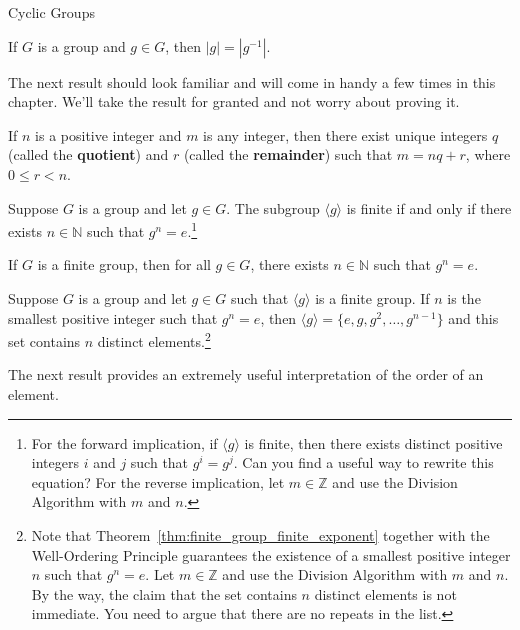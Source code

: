 \begin{section}{Cyclic Groups}
\begin{theorem}
If $G$ is a group and $g\in G$, then $|g|=|g^{-1}|$.
\end{theorem}

The next result should look familiar and will come in handy a few times in this chapter. We'll take the result for granted and not worry about proving it.

\begin{theorem}
If $n$ is a positive integer and $m$ is any integer, then there exist unique integers $q$ (called the \textbf{quotient}) and $r$ (called the \textbf{remainder}) such that $m=nq+r$, where $0\leq r<n$.
\end{theorem}

\begin{theorem}\label{thm:finite_group_finite_exponent}
Suppose $G$ is a group and let $g\in G$. The subgroup $\langle g\rangle$ is finite if and only if there exists $n\in\mathbb{N}$ such that $g^n=e$.\footnote{For the forward implication, if $\langle g\rangle$ is finite, then there exists distinct positive integers $i$ and $j$ such that $g^i=g^j$.  Can you find a useful way to rewrite this equation? For the reverse implication, let $m\in\mathbb{Z}$ and use the Division Algorithm with $m$ and $n$.}
\end{theorem}

\begin{corollary}\label{cor:finite_group_finite_exponent}
If $G$ is a finite group, then for all $g\in G$, there exists $n\in\mathbb{N}$ such that $g^n=e$.
\end{corollary}

\begin{theorem}
Suppose $G$ is a group and let $g\in G$ such that $\langle g\rangle$ is a finite group. If $n$ is the smallest positive integer such that $g^n=e$, then $\langle g\rangle = \{e, g, g^2, \ldots, g^{n-1}\}$ and this set contains $n$ distinct elements.\footnote{Note that Theorem~\ref{thm:finite_group_finite_exponent} together with the Well-Ordering Principle guarantees the existence of a smallest positive integer $n$ such that $g^n=e$. Let $m\in\mathbb{Z}$ and use the Division Algorithm with $m$ and $n$. By the way, the claim that the set contains $n$ distinct elements is not immediate.  You need to argue that there are no repeats in the list.}
\end{theorem}

The next result provides an extremely useful interpretation of the order of an element.


\end{section}
